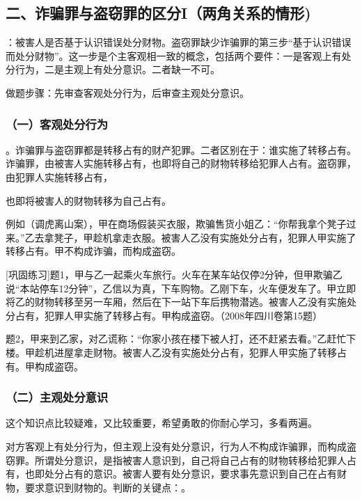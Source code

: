 \subsection*{二、诈骗罪与盗窃罪的区分I（两角关系的情形)}

：被害人是否基于认识错误处分财物。盗窃罪缺少诈骗罪的第三步“基于认识错误而处分财物”。这一步是个主客观相一致的概念，包括两个要件：一是客观上有处分行为，二是主观上有处分意识。二者缺一不可。

做题步骤：先审查客观处分行为，后审查主观处分意识。


\subsubsection*{（一）客观处分行为}

。诈骗罪与盗窃罪都是转移占有的财产犯罪。二者区别在于：谁实施了转移占有。诈骗罪，由被害人实施转移占有，也即将自己的财物转移给犯罪人占有。盗窃罪，由犯罪人实施转移占有，

也即将被害人的财物转移为自己占有。

例如（调虎离山案），甲在商场假装买衣服，欺骗售货小姐乙：“你帮我拿个凳子过来。”乙去拿凳子，甲趁机拿走衣服。被害人乙没有实施处分占有，犯罪人甲实施了转移占有。甲不构成诈骗，而构成盗窃。

[巩固练习]题1，甲与乙一起乘火车旅行。火车在某车站仅停2分钟，但甲欺骗乙说“本站停车12分钟”，乙信以为真，下车购物。乙刚下车，火车便发车了。甲立即将乙的财物转移至另一车厢，然后在下一站下车后携物潜逃。被害人乙没有实施处分占有，犯罪人甲实施了转移占有。甲构成盗窃。（2008年四川卷第15题）

题2，甲来到乙家，对乙谎称：“你家小孩在楼下被人打，还不赶紧去看。”乙赶忙下楼。甲趁机进屋拿走财物。被害人乙没有实施处分占有，犯罪人甲实施了转移占有。甲构成盗窃。

\subsubsection*{（二）主观处分意识}

这个知识点比较疑难，又比较重要，希望勇敢的你耐心学习，多看两遍。

对方客观上有处分行为，但主观上没有处分意识，行为人不构成诈骗罪，而构成盗窃罪。所谓处分意识，是指被害人意识到，自己将自己占有的财物转移给犯罪人占有，也即处分占有的意识。被害人要有处分意识，要求事先意识到自己在占有财物，要求意识到财物的。判断的关键点：。

